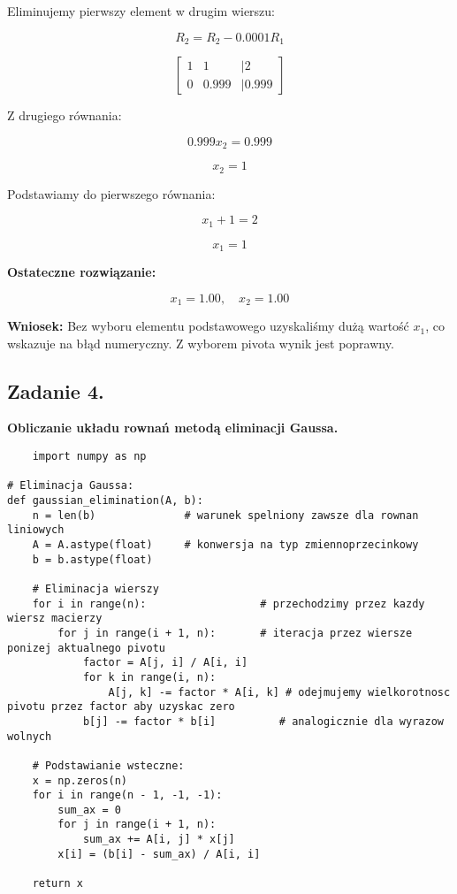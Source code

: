 \documentclass{article}
\begin{document}
Eliminujemy pierwszy element w drugim wierszu:

\[
R_2 = R_2 - 0.0001 R_1
\]

\[
\begin{bmatrix}
1 & 1 & | 2 \\
0 & 0.999 & | 0.999
\end{bmatrix}
\]

Z drugiego równania:

\[
0.999 x_2 = 0.999
\]

\[
x_2 = 1
\]

Podstawiamy do pierwszego równania:

\[
x_1 + 1 = 2
\]

\[
x_1 = 1
\]

\textbf{Ostateczne rozwiązanie:}

\[
x_1 = 1.00, \quad x_2 = 1.00
\]

\textbf{Wniosek:} Bez wyboru elementu podstawowego uzyskaliśmy dużą wartość \( x_1 \), co wskazuje na błąd numeryczny. Z wyborem pivota wynik jest poprawny.

\subsection{Zadanie 4.}
\textbf{Obliczanie układu rownań metodą eliminacji Gaussa.}
\begin{lstlisting}
    import numpy as np

# Eliminacja Gaussa:
def gaussian_elimination(A, b):
    n = len(b)              # warunek spelniony zawsze dla rownan liniowych 
    A = A.astype(float)     # konwersja na typ zmiennoprzecinkowy
    b = b.astype(float)

    # Eliminacja wierszy
    for i in range(n):                  # przechodzimy przez kazdy wiersz macierzy              
        for j in range(i + 1, n):       # iteracja przez wiersze ponizej aktualnego pivotu
            factor = A[j, i] / A[i, i]  
            for k in range(i, n):       
                A[j, k] -= factor * A[i, k] # odejmujemy wielkorotnosc pivotu przez factor aby uzyskac zero 
            b[j] -= factor * b[i]          # analogicznie dla wyrazow wolnych 

    # Podstawianie wsteczne:
    x = np.zeros(n)                         
    for i in range(n - 1, -1, -1):          
        sum_ax = 0
        for j in range(i + 1, n):           
            sum_ax += A[i, j] * x[j]
        x[i] = (b[i] - sum_ax) / A[i, i]    

    return x
\end{lstlisting}
\end{document}
